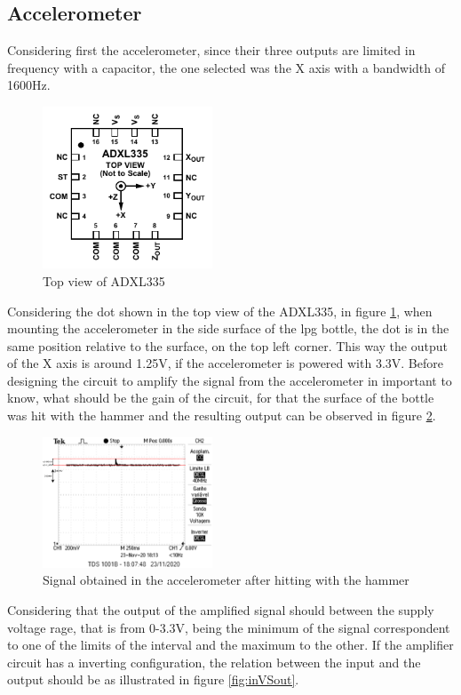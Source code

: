 \subsection{Accelerometer}
Considering first the accelerometer, since their three outputs are limited in frequency with a capacitor, the one selected was the X axis with a bandwidth of 1600Hz.
\begin{figure}[]
    \centering
    \includegraphics[width=0.45\textwidth]{Chapters/4CHP/Figures/accTopView.pdf}
    \caption{Top view of ADXL335}
    \label{fig:topViewADXL}
\end{figure}
Considering the dot shown in the top view of the ADXL335, in figure \ref{fig:topViewADXL}, when mounting the accelerometer in the side surface of the \acrshort{lpg} bottle, the dot is in the same position relative to the surface, on the top left corner. This way the output of the X axis is around 1.25V, if the accelerometer is powered with 3.3V. Before designing the circuit to amplify the signal from the accelerometer in important to know, what should be the gain of the circuit, for that the surface of the bottle was hit with the hammer and the resulting output can be observed in figure \ref{fig:NampSigAcc}.
\begin{figure}[]
    \centering
    \includegraphics[width=0.45\textwidth]{Chapters/4CHP/Figures/NAmpSigAcc.eps}
    \caption{Signal obtained in the accelerometer after hitting with the hammer}
    \label{fig:NampSigAcc}
\end{figure}
Considering that the output of the amplified signal should between the supply voltage rage, that is from 0-3.3V, being the minimum of the signal correspondent to one of the limits of the interval and the maximum to the other. If the amplifier circuit has a inverting configuration, the relation between the input and the output should be as illustrated in figure \ref{fig:inVSout}.
